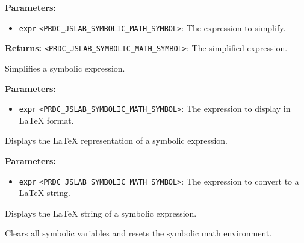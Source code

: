 \documentclass[12pt,a4paper]{article}
\begin{document}
\vspace{5mm}
\noindent {}


\noindent \textbf{Parameters:}
\begin{itemize}
  \item \texttt{expr} \texttt{<PRDC\_JSLAB\_SYMBOLIC\_MATH\_SYMBOL>}: The expression to simplify.
\end{itemize}

\noindent \textbf{Returns:} \texttt{<PRDC\_JSLAB\_SYMBOLIC\_MATH\_SYMBOL>}: The simplified expression.

\noindent Simplifies a symbolic expression.

\vspace{5mm}
\noindent {}


\noindent \textbf{Parameters:}
\begin{itemize}
  \item \texttt{expr} \texttt{<PRDC\_JSLAB\_SYMBOLIC\_MATH\_SYMBOL>}: The expression to display in LaTeX format.
\end{itemize}

\noindent Displays the LaTeX representation of a symbolic expression.

\vspace{5mm}
\noindent {}


\noindent \textbf{Parameters:}
\begin{itemize}
  \item \texttt{expr} \texttt{<PRDC\_JSLAB\_SYMBOLIC\_MATH\_SYMBOL>}: The expression to convert to a LaTeX string.
\end{itemize}

\noindent Displays the LaTeX string of a symbolic expression.

\vspace{5mm}
\noindent {}


\noindent Clears all symbolic variables and resets the symbolic math environment.




\end{document}

